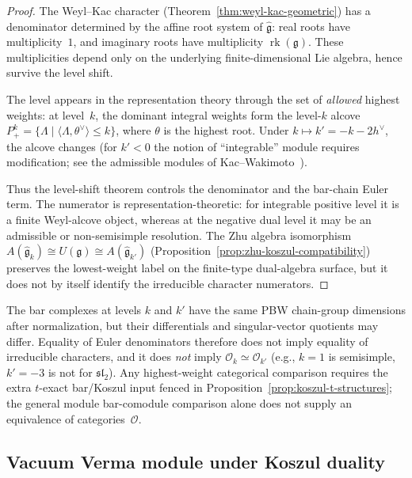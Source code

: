 \begin{proof}
The Weyl--Kac character (Theorem~\ref{thm:weyl-kac-geometric})
has a denominator determined by the affine root system of
$\widehat{\mathfrak g}$: real roots have multiplicity~$1$, and
imaginary roots have multiplicity $\operatorname{rk}(\mathfrak g)$.
These multiplicities depend only on the underlying finite-dimensional
Lie algebra, hence survive the level shift.

The level appears in the representation theory through the set of
\emph{allowed} highest weights: at level~$k$, the dominant integral
weights form the level-$k$ alcove
$P^k_+ = \{\Lambda \mid \langle \Lambda, \theta^\vee \rangle \leq k\}$,
where $\theta$ is the highest root. Under $k \mapsto k' = -k-2h^\vee$,
the alcove changes (for $k' < 0$ the notion of ``integrable''
module requires modification; see the admissible
modules of Kac--Wakimoto~\cite{KW88}).

Thus the level-shift theorem controls the denominator and the
bar-chain Euler term. The numerator is representation-theoretic:
for integrable positive level it is a finite Weyl-alcove object,
whereas at the negative dual level it may be an admissible or
non-semisimple resolution. The Zhu algebra isomorphism
$A(\widehat{\mathfrak{g}}_k) \cong U(\mathfrak{g}) \cong
A(\widehat{\mathfrak{g}}_{k'})$
(Proposition~\ref{prop:zhu-koszul-compatibility}) preserves the
lowest-weight label on the finite-type dual-algebra surface, but it
does not by itself identify the irreducible character numerators.
\end{proof}

\begin{remark}
\label{rem:character-bar-cobar-duality}
The bar complexes at levels $k$ and $k'$ have the same PBW
chain-group dimensions after normalization, but their differentials
and singular-vector quotients may differ. Equality of Euler
denominators therefore does not imply equality of irreducible
characters, and it does \emph{not} imply
$\mathcal{O}_k \simeq \mathcal{O}_{k'}$
\textup{(}e.g., $k = 1$ is semisimple, $k' = -3$ is not for
$\mathfrak{sl}_2$\textup{)}. Any highest-weight categorical
comparison requires the extra $t$-exact bar/Koszul input fenced in
Proposition~\ref{prop:koszul-t-structures}; the general module
bar-comodule comparison alone does not supply an equivalence of
categories~$\mathcal{O}$.
\end{remark}

\subsection{Vacuum Verma module under Koszul duality}
\label{sec:vacuum-koszul}

